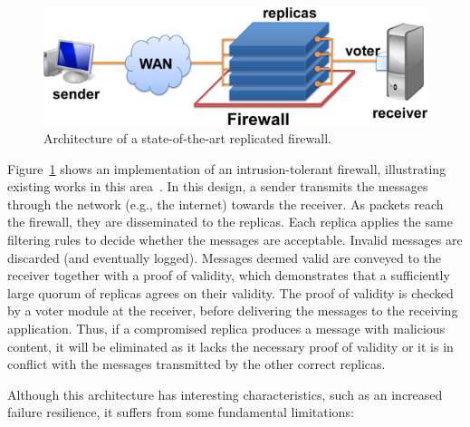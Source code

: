 \begin{figure}[h]
\begin{center}
\includegraphics[width=.8\columnwidth]{images/images/arch_traditional.pdf}
\caption{Architecture of a state-of-the-art replicated firewall.}
\label{fig:traditional}
\end{center}
\end{figure}

Figure~\ref{fig:traditional} shows an implementation of an intrusion-tolerant firewall, illustrating  existing works in this area~\cite{Sousa:2010,Roeder:2010}.
In this design, a sender transmits the messages through the network (e.g., the internet) towards the receiver.
As packets reach the firewall, they are disseminated to the replicas. 
Each replica applies the same filtering rules to decide whether the messages are acceptable. 
Invalid messages are discarded (and eventually logged). 
Messages deemed valid are conveyed to the receiver together with a proof of validity, which demonstrates that a sufficiently large quorum of replicas agrees on their validity.
The proof of validity is checked by a voter module at the receiver, before delivering the messages to the receiving application.
Thus, if a compromised replica produces a message with malicious content, it will be eliminated as it lacks the necessary proof of validity or it is in conflict with the messages transmitted by the other correct replicas.

Although this architecture has interesting characteristics, such as an increased failure resilience, it suffers from some fundamental limitations:

